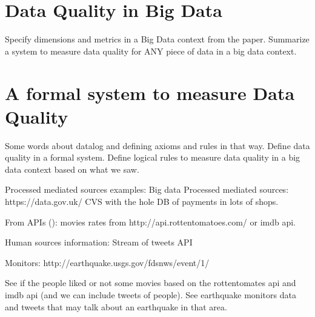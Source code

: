 \documentclass[%
 reprint,
 amsmath,amssymb,
 aps,
]{revtex4-1}
\begin{document}
\section{\label{sec:level1}Data Quality in Big Data}

Specify dimensions and metrics in a Big Data context from the paper.
Summarize a system to measure data quality for ANY piece of data in a big data context.

\section{\label{sec:level1}A formal system to measure Data Quality}

Some words about datalog and defining axioms and rules in that way.
Define data quality in a formal system.
Define logical rules to measure data quality in a big data context based on what we saw.

Processed mediated sources examples:
Big data Processed mediated sources: https://data.gov.uk/ CVS with the hole DB of payments in lots of shops.

From APIs (): movies rates from http://api.rottentomatoes.com/ or imdb api.

Human sources information:
Stream of tweets API

Monitors:
http://earthquake.usgs.gov/fdsnws/event/1/

See if the people liked or not some movies based on the rottentomates api and imdb api (and we can include tweets of people).
See earthquake monitors data and tweets that may talk about an earthquake in that area.
\end{document}
